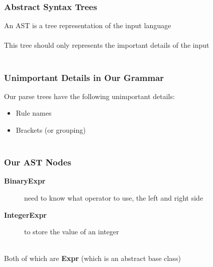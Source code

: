 \documentclass[aspectratio=169]{beamer}
\begin{document}
\begin{frame}
\frametitle{Abstract Syntax Trees}

An AST is a tree representation of the input language\\~\\

This tree should only represents the important details of the input\\~\\
\end{frame}

\begin{frame}
\frametitle{Unimportant Details in Our Grammar}

Our parse trees have the following unimportant details:
\begin{itemize}
  \item Rule names
  \item Brackets (or grouping)\\~\\
\end{itemize}
\end{frame}

\begin{frame}
\frametitle{Our AST Nodes}

\begin{description}
  \item[\textbf{BinaryExpr}] need to know what operator to use, the left and
                             right side
  \item[\textbf{IntegerExpr}] to store the value of an integer\\~\\
\end{description}
Both of which are \textbf{Expr} (which is an abstract base class)
\end{frame}
\end{document}
